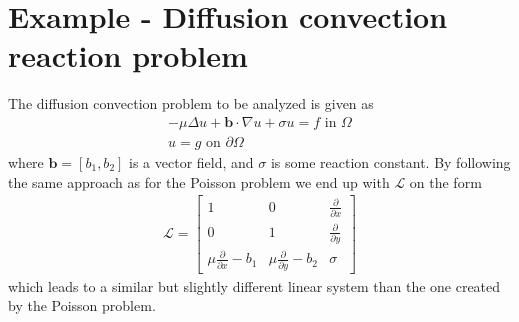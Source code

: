 \section{Example - Diffusion convection reaction problem}
%
The diffusion convection problem to be analyzed is given as 
\begin{align}
	-\mu \Delta u + \mathbf{b} \cdot \nabla u +\sigma u = f \text{ in } \Omega \\
	u = g \text{ on } \partial \Omega
	\label{eq:DiffTrans}
\end{align}
where $\mathbf{b} = [b_1 , b_2]$ is a vector field, and $\sigma$ is some reaction constant. By following the same approach as for the Poisson problem we end up with $\mathcal{L}$ on the form
\begin{align}
	\mathcal{L} =
	\begin{bmatrix}
		1 & 0 & \frac{\partial} {\partial x}  \\
		0 & 1 & \frac{\partial} {\partial y}  \\
		\mu \frac{\partial} {\partial x} - b_1 & \mu \frac{\partial} {\partial y} -b_2 & \sigma
	\end{bmatrix}
	\label{eq:AmatrixDiff}
\end{align}
which leads to a similar but slightly different linear system than the one created by the Poisson problem.


